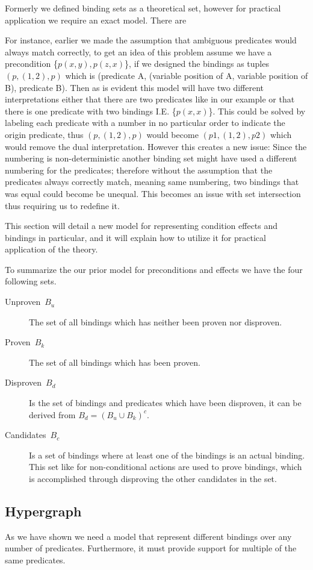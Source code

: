 \documentclass[../Master.tex]{subfiles}
\begin{document}
Formerly we defined binding sets as a theoretical set, however for practical application we require an exact model.
There are 

 
For instance, earlier we made the assumption that ambiguous predicates would always match correctly, to get an idea of this problem 
assume we have a precondition \{$p(x,y), p(z,x)$\}, if we designed the bindings as tuples $(p,(1,2),p)$ which is (predicate A, (variable position of A, variable position of B), predicate B). 
Then as is evident this model will have two different interpretations either that there are two predicates like in our example or that there is one predicate with two bindings I.E. \{$p(x,x)$\}.
This could be solved by labeling each predicate with a number in no particular order  to indicate the origin predicate, thus $(p,(1,2),p)$ would become  $(p1,(1,2),p2)$ which would remove the dual interpretation.
However this creates a new issue: Since the numbering is non-deterministic another binding set might have used a different numbering for the predicates; 
therefore without the assumption that the predicates always correctly match, meaning same numbering, two bindings that was equal could become be unequal. This becomes an issue with set intersection thus requiring us to redefine it. 


This section will detail a new model for representing condition effects and bindings in particular, and it will explain how to utilize it for practical application of the theory.

To summarize the our prior model for preconditions and effects we have the four following sets.
\begin{description}
	\item [{Unproven~$B_u$}] The set of all bindings which has
	neither been proven nor disproven. 
	\item [{Proven~$B_k$}] The set of all bindings which has been
	proven.
	\item [{Disproven~$B_d$}] Is the set of bindings and predicates which have
	been disproven, it can be derived from $B_d=\left(B_u\cup B_k\right)^{c}$.
	\item [{Candidates~$B_c$}] Is a set of bindings where at least one of the bindings is an actual binding.
	This set like for non-conditional actions are used to prove bindings,
	which is accomplished through disproving the other candidates in the set.
\end{description}

	
	\subsection*{Hypergraph}
	As we have shown we need a model that represent different bindings over any number of predicates. 
	Furthermore, it must provide support for multiple of the same predicates.
	
\end{document}
